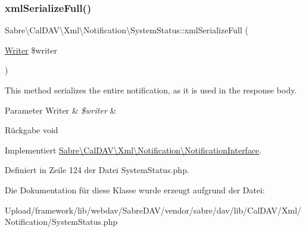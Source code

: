 \subsubsection{\texorpdfstring{xml\+Serialize\+Full()}{xmlSerializeFull()}}
{\footnotesize\ttfamily Sabre\textbackslash{}\+Cal\+D\+A\+V\textbackslash{}\+Xml\textbackslash{}\+Notification\textbackslash{}\+System\+Status\+::xml\+Serialize\+Full (\begin{DoxyParamCaption}\item[{\mbox{\hyperlink{class_sabre_1_1_xml_1_1_writer}{Writer}}}]{\$writer }\end{DoxyParamCaption})}

This method serializes the entire notification, as it is used in the response body.


\begin{DoxyParams}[1]{Parameter}
Writer & {\em \$writer} & \\
\hline
\end{DoxyParams}
\begin{DoxyReturn}{Rückgabe}
void 
\end{DoxyReturn}


Implementiert \mbox{\hyperlink{interface_sabre_1_1_cal_d_a_v_1_1_xml_1_1_notification_1_1_notification_interface_abb545ebd302b3bdf972d159065c6a8b4}{Sabre\textbackslash{}\+Cal\+D\+A\+V\textbackslash{}\+Xml\textbackslash{}\+Notification\textbackslash{}\+Notification\+Interface}}.



Definiert in Zeile 124 der Datei System\+Status.\+php.



Die Dokumentation für diese Klasse wurde erzeugt aufgrund der Datei\+:\begin{DoxyCompactItemize}
\item 
Upload/framework/lib/webdav/\+Sabre\+D\+A\+V/vendor/sabre/dav/lib/\+Cal\+D\+A\+V/\+Xml/\+Notification/System\+Status.\+php\end{DoxyCompactItemize}
